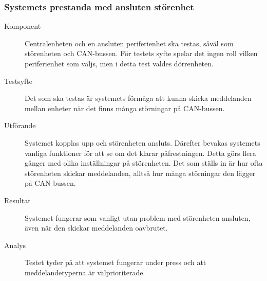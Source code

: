 \documentclass[a4paper]{article}
\begin{document}
\subsubsection{Systemets prestanda med ansluten störenhet}
\begin{description}
\item[Komponent] Centralenheten och en ansluten periferienhet ska testas, såväl som störenheten och CAN-bussen.
För testets syfte spelar det ingen roll vilken periferienhet som väljs, men i detta test valdes dörrenheten.

\item[Testsyfte] Det som ska testas är systemets förmåga att kunna skicka meddelanden mellan enheter när det finns många störningar på CAN-bussen.

\item[Utförande] Systemet kopplas upp och störenheten ansluts. 
Därefter bevakas systemets vanliga funktioner för att se om det klarar påfrestningen.
Detta görs flera gånger med olika inställningar på störenheten.
Det som ställs in är hur ofta störenheten skickar meddelanden, alltså hur många störningar den lägger på CAN-bussen.

\item[Resultat] Systemet fungerar som vanligt utan problem med störenheten ansluten, även när den skickar meddelanden oavbrutet.

\item[Analys] Testet tyder på att systemet fungerar under press och att meddelandetyperna är välprioriterade.
\end{description}
\end{document}
